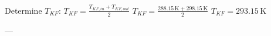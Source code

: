 Determine \( T_{KF} \):  
\( T_{KF} = \frac{T_{KF,in} + T_{KF,out}}{2} \)  
\( T_{KF} = \frac{288.15 \, \text{K} + 298.15 \, \text{K}}{2} \)  
\( T_{KF} = 293.15 \, \text{K} \)  

---